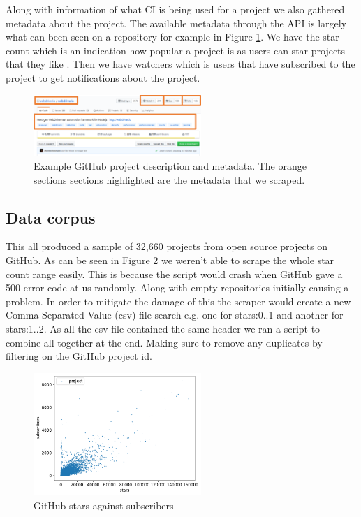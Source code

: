 \documentclass[10pt,conference]{IEEEtran}
\begin{document}
Along with information of what CI is being used for a project we also gathered metadata about the project. The available metadata through the API is largely what can been seen on a repository for example in Figure \ref{ExampleGitHubMetaData}. We have the star count which is an indication how popular a project is as users can star projects that they like \citet{Borges2016}. Then we have watchers which is users that have subscribed to the project to get notifications about the project. 

\begin{figure}[h]
  \centering
  \includegraphics[scale=0.5, width=2.5in]{readme metadata example.png}
  \caption[alt text]{Example GitHub project description and metadata\cite{GithubMetaDataExample}. The orange sections sections highlighted are the metadata that we scraped.}
  \label{ExampleGitHubMetaData}
\end{figure}

\vspace*{-0.05in}
\subsection{Data corpus}
\label{section:corpus}
\vspace*{-0.05in}
This all produced a sample of 32,660 projects from open source projects on GitHub. As can be seen in Figure \ref{graph_scatter_stars_vs_subs} we weren't able to scrape the whole star count range easily. This is because the script would crash when GitHub gave a 500 error code at us randomly. Along with empty repositories initially causing a problem. In order to mitigate the damage of this the scraper would create a new Comma Separated Value (csv) file search e.g. one for stars:0..1 and another for stars:1..2. As all the csv file contained the same header we ran a script to combine all together at the end. Making sure to remove any duplicates by filtering on the GitHub project id.

\begin{figure}[!htbp]
  \centering
  \includegraphics[width=2.5in]{../src/results/sub vs stars.pdf}
  \caption[alt text]{GitHub stars against subscribers}
  \label{graph_scatter_stars_vs_subs}
\end{figure}
\end{document}
